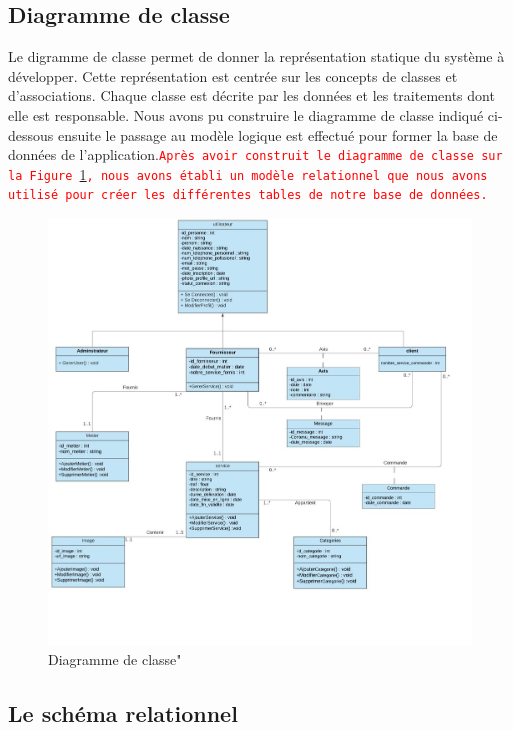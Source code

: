 \documentclass[french]{report}
\newcommand\rmq[1]{\textcolor{red}{\tt #1}}
\begin{document}
\subsection{Diagramme de classe}

Le digramme de classe permet de donner la représentation statique du système à
développer. Cette représentation est centrée sur les concepts de classes et
d'associations. Chaque classe est décrite par les données et les traitements dont
elle est responsable. Nous avons pu construire le diagramme de classe indiqué
ci-dessous ensuite le passage au modèle logique est effectué pour former la base
de données de l'application.\rmq{Après avoir construit le diagramme de classe
sur la Figure~\ref{fig:diag_classes}, nous avons établi un modèle relationnel
que nous avons utilisé pour créer les différentes tables de notre base de
données.}

  \begin{figure}[H]
    \centering
    \includegraphics[width=1\textwidth]{images/Diag de classe.jpg}
    \caption{Diagramme de classe"}
    \label{fig:diag_classes}
\end{figure}

\subsection{Le schéma relationnel}
\end{document}
